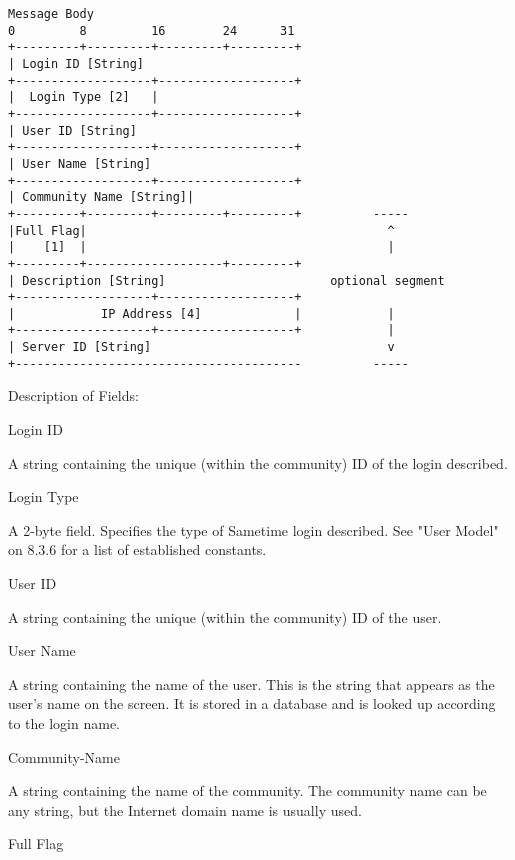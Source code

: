\documentclass[titlepage,oneside]{book}
\begin{document}
\begin{verbatim}
Message Body
0         8         16        24      31
+---------+---------+---------+---------+
| Login ID [String]
+-------------------+-------------------+
|  Login Type [2]   |
+-------------------+-------------------+
| User ID [String]
+-------------------+-------------------+
| User Name [String]
+-------------------+-------------------+
| Community Name [String]|
+---------+---------+---------+---------+          -----
|Full Flag|                                          ^
|    [1]  |                                          |
+---------+-------------------+---------+
| Description [String]                       optional segment
+-------------------+-------------------+
|            IP Address [4]             |            |
+-------------------+-------------------+            |
| Server ID [String]                                 v
+----------------------------------------          -----
\end{verbatim}

\par{} Description of Fields:

\par{} Login ID

\subpar{}   A string containing the unique (within the community) ID of the
  login described.

\par{} Login Type

\subpar{}   A 2-byte field. Specifies the type of Sametime login described. See
  "User Model" on 8.3.6 for a list of established constants.

\par{} User ID

\subpar{}   A string containing the unique (within the community) ID of the
  user.

\par{} User Name

\subpar{}   A string containing the name of the user. This is the string that
  appears as the user's name on the screen. It is stored in a
  database and is looked up according to the login name.

\par{} Community-Name

\subpar{}   A string containing the name of the community. The community name
  can be any string, but the Internet domain name is usually used.

\par{} Full Flag
\end{document}
